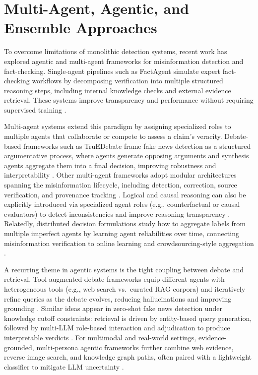 \section{Multi-Agent, Agentic, and Ensemble Approaches} 

To overcome limitations of monolithic detection systems, recent work has explored agentic and multi-agent frameworks for misinformation detection and fact-checking. Single-agent pipelines such as FactAgent simulate expert fact-checking workflows by decomposing verification into multiple structured reasoning steps, including internal knowledge checks and external evidence retrieval. These systems improve transparency and performance without requiring supervised training \cite{li2024largelanguagemodelagent}. 

Multi-agent systems extend this paradigm by assigning specialized roles to multiple agents that collaborate or compete to assess a claim's veracity. Debate-based frameworks such as TruEDebate frame fake news detection as a structured argumentative process, where agents generate opposing arguments and synthesis agents aggregate them into a final decision, improving robustness and interpretability \cite{10.1145/3726302.3730092}. Other multi-agent frameworks adopt modular architectures spanning the misinformation lifecycle, including detection, correction, source verification, and provenance tracking \cite{gautam2025multiagentsystemsmisinformationlifecycle}. Logical and causal reasoning can also be explicitly introduced via specialized agent roles (e.g., counterfactual or causal evaluators) to detect inconsistencies and improve reasoning transparency \cite{10.1145/3696410.3714748}. Relatedly, distributed decision formulations study how to aggregate labels from multiple imperfect agents by learning agent reliabilities over time, connecting misinformation verification to online learning and crowdsourcing-style aggregation \cite{verma2025multiagentfactchecking}. 

A recurring theme in agentic systems is the tight coupling between debate and retrieval. Tool-augmented debate frameworks equip different agents with heterogeneous tools (e.g., web search vs.\ curated RAG corpora) and iteratively refine queries as the debate evolves, reducing hallucinations and improving grounding \cite{jeong2026toolmadmultiagentdebateframework}. Similar ideas appear in zero-shot fake news detection under knowledge cutoff constraints: retrieval is driven by entity-based query generation, followed by multi-LLM role-based interaction and adjudication to produce interpretable verdicts \cite{wu2025zofiazeroshotfakenews}. For multimodal and real-world settings, evidence-grounded, multi-persona agentic frameworks further combine web evidence, reverse image search, and knowledge graph paths, often paired with a lightweight classifier to mitigate LLM uncertainty \cite{bukke2025agenticmultipersonaframeworkevidenceaware}. 

